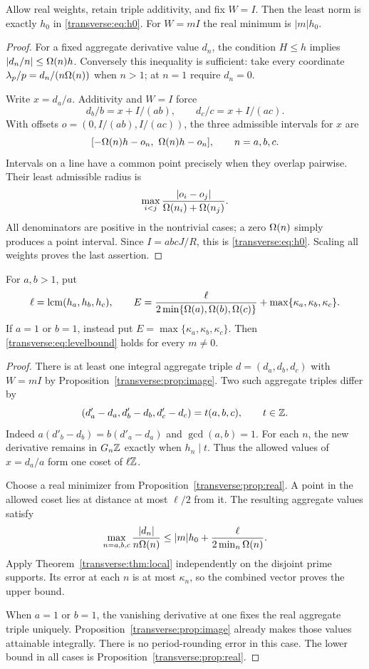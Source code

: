 \begin{proposition}\label{transverse:prop:real}
Allow real weights, retain triple additivity, and fix $W=I$. Then the least norm is exactly $h_0$ in \eqref{transverse:eq:h0}. For $W=mI$ the real minimum is $|m|h_0$.
\end{proposition}
\begin{proof}
For a fixed aggregate derivative value $d_n$, the condition $H\le h$ implies $|d_n/n|\le\Omega(n)h$. Conversely this inequality is sufficient: take every coordinate $\lambda_p/p=d_n/(n\Omega(n))$ when $n>1$; at $n=1$ require $d_n=0$.

Write $x=d_a/a$. Additivity and $W=I$ force
\[
 d_b/b=x+I/(ab),\qquad d_c/c=x+I/(ac).
\]
With offsets $o=(0,I/(ab),I/(ac))$, the three admissible intervals for $x$ are
\[
 [-\Omega(n)h-o_n,\ \Omega(n)h-o_n],\qquad n=a,b,c.
\]
Intervals on a line have a common point precisely when they overlap pairwise. Their least admissible radius is
\[
 \max_{i<j}\frac{|o_i-o_j|}{\Omega(n_i)+\Omega(n_j)}.
\]
All denominators are positive in the nontrivial cases; a zero $\Omega(n)$ simply produces a point interval. Since $I=abcJ/R$, this is \eqref{transverse:eq:h0}. Scaling all weights proves the last assertion.
\end{proof}

\begin{theorem}\label{transverse:thm:global}
For $a,b>1$, put
\[
 \ell=\operatorname{lcm}(h_a,h_b,h_c),\qquad
 E=\frac{\ell}{2\min\{\Omega(a),\Omega(b),\Omega(c)\}}+
       \max\{\kappa_a,\kappa_b,\kappa_c\}.
\]
If $a=1$ or $b=1$, instead put $E=\max\{\kappa_a,\kappa_b,\kappa_c\}$. Then \eqref{transverse:eq:levelbound} holds for every $m\ne0$.
\end{theorem}
\begin{proof}
There is at least one integral aggregate triple $d=(d_a,d_b,d_c)$ with $W=mI$ by Proposition~\ref{transverse:prop:image}. Two such aggregate triples differ by
\[
 (d'_a-d_a,d'_b-d_b,d'_c-d_c)=t(a,b,c),\qquad t\in\mathbb Z.
\]
Indeed $a(d'_b-d_b)=b(d'_a-d_a)$ and $\gcd(a,b)=1$. For each $n$, the new derivative remains in $G_n\mathbb Z$ exactly when $h_n\mid t$. Thus the allowed values of $x=d_a/a$ form one coset of $\ell\mathbb Z$.

Choose a real minimizer from Proposition~\ref{transverse:prop:real}. A point in the allowed coset lies at distance at most $\ell/2$ from it. The resulting aggregate values satisfy
\[
 \max_{n=a,b,c}\frac{|d_n|}{n\Omega(n)}
 \le |m|h_0+\frac{\ell}{2\min_n\Omega(n)}.
\]
Apply Theorem~\ref{transverse:thm:local} independently on the disjoint prime supports. Its error at each $n$ is at most $\kappa_n$, so the combined vector proves the upper bound.

When $a=1$ or $b=1$, the vanishing derivative at one fixes the real aggregate triple uniquely. Proposition~\ref{transverse:prop:image} already makes those values attainable integrally. There is no period-rounding error in this case. The lower bound in all cases is Proposition~\ref{transverse:prop:real}.
\end{proof}

